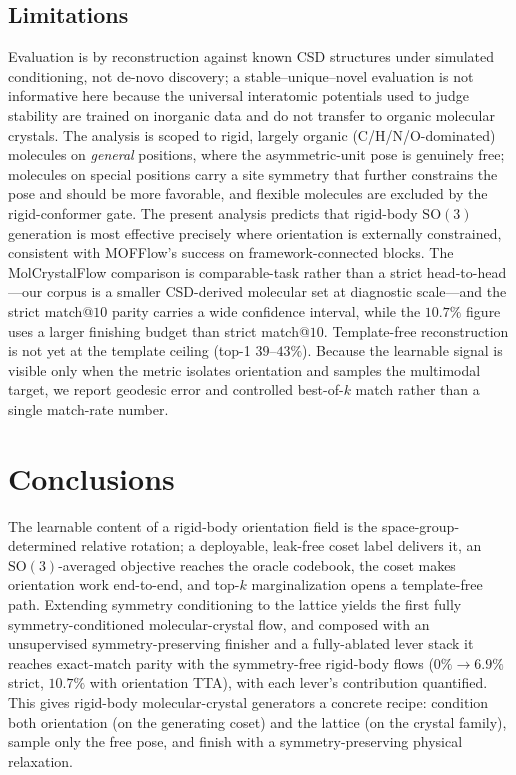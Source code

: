 \documentclass[journal=jcisd8,manuscript=article]{achemso}
\begin{document}
\subsection{Limitations}\label{sec:limits}
Evaluation is by reconstruction against known CSD structures under simulated
conditioning, not de-novo discovery; a stable--unique--novel evaluation is not
informative here because the universal interatomic potentials used to judge
stability are trained on inorganic data\cite{deng2023chgnet} and do not transfer to
organic molecular crystals. The analysis is scoped to rigid, largely organic
(C/H/N/O-dominated) molecules on \emph{general} positions, where the
asymmetric-unit pose is genuinely free; molecules on special positions carry a site
symmetry that further constrains the pose and should be more favorable, and
flexible molecules are excluded by the rigid-conformer gate. The present analysis
predicts that rigid-body $\mathrm{SO}(3)$ generation is most effective precisely
where orientation is externally constrained, consistent with MOFFlow's success on
framework-connected blocks\cite{kim2025mofflow}. The MolCrystalFlow comparison is
comparable-task rather than a strict head-to-head---our corpus is a smaller
CSD-derived molecular set at diagnostic scale---and the strict match@$10$ parity
carries a wide confidence interval, while the $10.7\%$ figure uses a larger
finishing budget than strict match@$10$. Template-free reconstruction is not yet at
the template ceiling (top-1 $39$--$43\%$). Because the learnable signal is visible
only when the metric isolates orientation and samples the multimodal target, we
report geodesic error and controlled best-of-$k$ match rather than a single
match-rate number\cite{martirossyan2025matching}.

\section{Conclusions}
The learnable content of a rigid-body orientation field is the
space-group-determined relative rotation; a deployable, leak-free coset label
delivers it, an $\mathrm{SO}(3)$-averaged objective reaches the oracle codebook, the
coset makes orientation work end-to-end, and top-$k$ marginalization opens a
template-free path. Extending symmetry conditioning to the lattice yields the first
fully symmetry-conditioned molecular-crystal flow, and composed with an
unsupervised symmetry-preserving finisher and a fully-ablated lever stack it reaches
exact-match parity with the symmetry-free rigid-body flows ($0\%\!\to\!6.9\%$
strict, $10.7\%$ with orientation TTA), with each lever's contribution quantified. This gives rigid-body molecular-crystal
generators\cite{zeng2026molcrystalflow} a concrete recipe: condition both
orientation (on the generating coset) and the lattice (on the crystal family),
sample only the free pose, and finish with a symmetry-preserving physical
relaxation.
\end{document}
